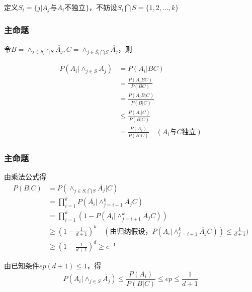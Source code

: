 \documentclass[AutoFakeBold]{beamer}
\begin{document}
{\begin{frame}
        定义$S_i = \{j|A_j\text{与}A_i\text{不独立}\}$，不妨设$S_i \bigcap S = \{1, 2, ..., k\}$
    \end{frame}

    \begin{frame}
        \frametitle{主命题}
    
        令$B = \wedge_{j \in S_i \bigcap S} \overline{A_j}, C =  \wedge_{j \in \overline{S_i} \bigcap S} \overline{A_j}$，则
        
        \begin{equation*}
        \begin{aligned}
             P(A_i |\wedge_{j \in S} \overline{A_j})
             &= P(A_i | BC) \\
             &= \frac{P(A_iBC)}{P(BC)} \\
             &= \frac{P(A_iB|C)}{P(B|C)} \\
             &\le \frac{P(A_i|C)}{P(B|C)} \\
             &=\frac{P(A_i)}{P(B|C)} \quad (A_i\text{与}C\text{独立})
        \end{aligned}
        \end{equation*}
        
    \end{frame}

    \begin{frame}
        \frametitle{主命题}
    
        由乘法公式得
        \begin{equation*}
        \begin{aligned}
            P(B|C) 
            &= P(\wedge_{j \in S_i \bigcap S}\overline{A_j}|C)\\ 
            &= \prod_{i=1}^{k}P(\overline{A_i}|\wedge_{j=i+1}^{k}\overline{A_j}C )\\ 
            &= \prod_{i=1}^{k}(1-P(A_i|\wedge_{j=i+1}^{k}\overline{A_j}C ))  \\ 
            &\ge(1 - \frac{1}{d+1})^k \quad (\text{由归纳假设}，P(A_i|\wedge_{j=i+1}^{k}\overline{A_j}C ))
            \le \frac{1}{d+1})\\
            &\ge(1 - \frac{1}{d+1})^d\ge e^{-1}%
        \end{aligned}
        \end{equation*}
    
        由已知条件$ep(d+1) \le 1$，得
         $$P(A_i |\wedge_{j \in S} \overline{A_j}) \le \frac{P(A_i)}{P(B|C)} \le ep \le \frac{1}{d+1}$$
    

\end{frame}}
\end{document}
